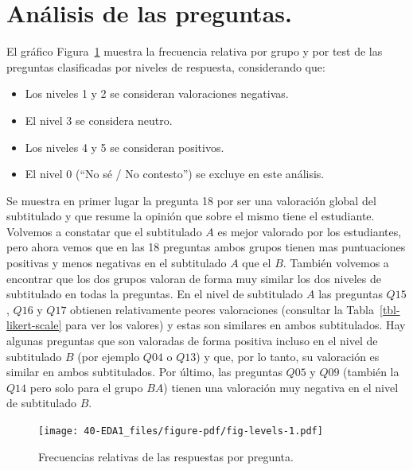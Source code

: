 \documentclass[
  12pt,
  a4paper,
  extrafontsizes,
  onecolumn,
  openright]{memoir}
\providecommand{\tightlist}{%
  \setlength{\itemsep}{0pt}\setlength{\parskip}{0pt}}\usepackage{longtable,booktabs,array}
\begin{document}
\hypertarget{anuxe1lisis-de-las-preguntas.}{%
\section{Análisis de las
preguntas.}\label{anuxe1lisis-de-las-preguntas.}}

El gráfico Figura~\ref{fig-levels} muestra la frecuencia relativa por
grupo y por test de las preguntas clasificadas por niveles de respuesta,
considerando que:

\begin{itemize}
\tightlist
\item
  Los niveles 1 y 2 se consideran valoraciones negativas.
\item
  El nivel 3 se considera neutro.
\item
  Los niveles 4 y 5 se consideran positivos.
\item
  El nivel 0 (\enquote{No sé / No contesto}) se excluye en este
  análisis.
\end{itemize}

Se muestra en primer lugar la pregunta 18 por ser una valoración global
del subtitulado y que resume la opinión que sobre el mismo tiene el
estudiante. Volvemos a constatar que el subtitulado \(A\) es mejor
valorado por los estudiantes, pero ahora vemos que en las 18 preguntas
ambos grupos tienen mas puntuaciones positivas y menos negativas en el
subtitulado \(A\) que el \(B\). También volvemos a encontrar que los dos
grupos valoran de forma muy similar los dos niveles de subtitulado en
todas la preguntas. En el nivel de subtitulado \(A\) las preguntas
\(Q15\), \(Q16\) y \(Q17\) obtienen relativamente peores valoraciones
(consultar la Tabla~\ref{tbl-likert-scale} para ver los valores) y estas
son similares en ambos subtitulados. Hay algunas preguntas que son
valoradas de forma positiva incluso en el nivel de subtitulado \(B\)
(por ejemplo \(Q04\) o \(Q13\)) y que, por lo tanto, su valoración es
similar en ambos subtitulados. Por último, las preguntas \(Q05\) y
\(Q09\) (también la \(Q14\) pero solo para el grupo \(BA\)) tienen una
valoración muy negativa en el nivel de subtitulado \(B\).

\begin{figure}[h]

{\centering \texttt{[image: 40-EDA1\_files/figure-pdf/fig-levels-1.pdf]}

}

\caption{\label{fig-levels}Frecuencias relativas de las respuestas por
pregunta.}

\end{figure}
\end{document}
